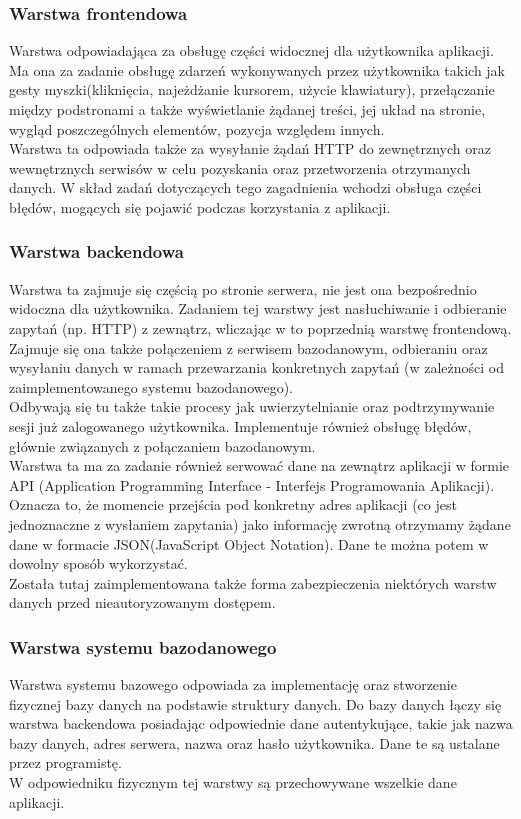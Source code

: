 \documentclass[eng,printmode]{mgr}
\begin{document}
\subsubsection{Warstwa frontendowa}
Warstwa odpowiadająca za obsługę części widocznej dla użytkownika aplikacji. Ma ona za zadanie obsługę zdarzeń wykonywanych przez użytkownika takich jak gesty myszki(kliknięcia, najeżdżanie kursorem, użycie klawiatury), przełączanie między podstronami a także wyświetlanie żądanej treści, jej układ na stronie, wygląd poszczególnych elementów, pozycja względem innych.
\\
Warstwa ta odpowiada także za wysyłanie żądań HTTP do zewnętrznych oraz wewnętrznych serwisów w celu pozyskania oraz przetworzenia otrzymanych danych. W skład zadań dotyczących tego zagadnienia wchodzi obsługa części błędów, mogących się pojawić podczas korzystania z aplikacji.
\subsubsection{Warstwa backendowa}
Warstwa ta zajmuje się częścią po stronie serwera, nie jest ona bezpośrednio widoczna dla użytkownika. Zadaniem tej warstwy jest nasłuchiwanie i odbieranie zapytań (np. HTTP) z zewnątrz, wliczając w to poprzednią warstwę frontendową. Zajmuje się ona także połączeniem z serwisem bazodanowym, odbieraniu oraz wysyłaniu danych w ramach przewarzania konkretnych zapytań (w zależności od zaimplementowanego systemu bazodanowego).
\\
Odbywają się tu także takie procesy jak uwierzytelnianie oraz podtrzymywanie sesji już zalogowanego użytkownika. Implementuje również obsługę błędów, głównie związanych z połączaniem bazodanowym.
\\
Warstwa ta ma za zadanie również serwować dane na zewnątrz aplikacji w formie API (Application Programming Interface - Interfejs Programowania Aplikacji)\cite{API}. Oznacza to, że momencie przejścia pod konkretny adres aplikacji (co jest jednoznaczne z wysłaniem zapytania) jako informację zwrotną otrzymamy żądane dane w formacie JSON(JavaScript Object Notation)\cite {JSON}. Dane te można potem w dowolny sposób wykorzystać.
\\
Została tutaj zaimplementowana także forma zabezpieczenia niektórych warstw danych przed nieautoryzowanym dostępem.
\subsubsection{Warstwa systemu bazodanowego}
Warstwa systemu bazowego odpowiada za implementację oraz stworzenie fizycznej bazy danych na podstawie struktury danych. Do bazy danych łączy się warstwa backendowa posiadając odpowiednie dane autentykujące, takie jak nazwa bazy danych, adres serwera, nazwa oraz hasło użytkownika. Dane te są ustalane przez programistę.
\\
W odpowiedniku fizycznym tej warstwy są przechowywane wszelkie dane aplikacji.
\end{document}
